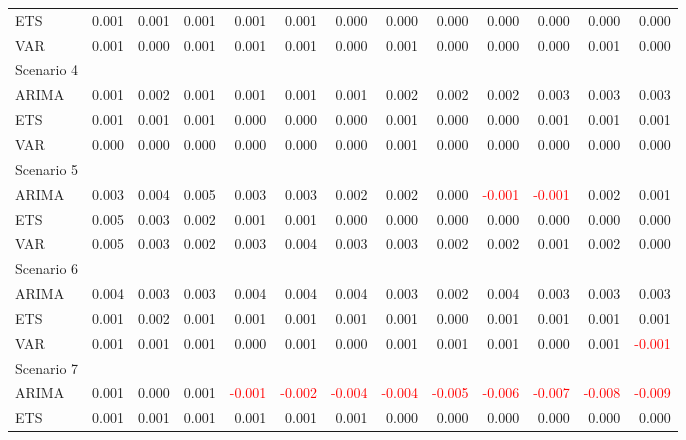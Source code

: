 \documentclass[a4paper,preprint,11pt,authoryear]{elsarticle}
\begin{document}
\begin{table}
{\begin{tabular}{lrrrrrrrrrrrr}
      ETS & 0.001 & 0.001 & 0.001 & 0.001 & 0.001 & 0.000 & 0.000 & 0.000 & 0.000 & 0.000 & 0.000 & 0.000 \\
      VAR & 0.001 & 0.000 & 0.001 & 0.001 & 0.001 & 0.000 & 0.001 & 0.000 & 0.000 & 0.000 & 0.001 & 0.000 \\
      \hline
      Scenario 4 & & & & & & & & & & & & \\
      \hline
      ARIMA & 0.001 & 0.002 & 0.001 & 0.001 & 0.001 & 0.001 & 0.002 & 0.002 & 0.002 & 0.003 & 0.003 & 0.003 \\
      ETS & 0.001 & 0.001 & 0.001 & 0.000 & 0.000 & 0.000 & 0.001 & 0.000 & 0.000 & 0.001 & 0.001 & 0.001 \\
      VAR & 0.000 & 0.000 & 0.000 & 0.000 & 0.000 & 0.000 & 0.001 & 0.000 & 0.000 & 0.000 & 0.000 & 0.000 \\
      \hline
      Scenario 5 & & & & & & & & & & & & \\
      \hline
      ARIMA & 0.003 & 0.004 & 0.005 & 0.003 & 0.003 & 0.002 & 0.002 & 0.000 & \textcolor{red}{-0.001} & \textcolor{red}{-0.001} & 0.002 & 0.001 \\
      ETS & 0.005 & 0.003 & 0.002 & 0.001 & 0.001 & 0.000 & 0.000 & 0.000 & 0.000 & 0.000 & 0.000 & 0.000 \\
      VAR & 0.005 & 0.003 & 0.002 & 0.003 & 0.004 & 0.003 & 0.003 & 0.002 & 0.002 & 0.001 & 0.002 & 0.000 \\
      \hline
      Scenario 6 & & & & & & & & & & & & \\
      \hline
      ARIMA & 0.004 & 0.003 & 0.003 & 0.004 & 0.004 & 0.004 & 0.003 & 0.002 & 0.004 & 0.003 & 0.003 & 0.003 \\
      ETS & 0.001 & 0.002 & 0.001 & 0.001 & 0.001 & 0.001 & 0.001 & 0.000 & 0.001 & 0.001 & 0.001 & 0.001 \\
      VAR & 0.001 & 0.001 & 0.001 & 0.000 & 0.001 & 0.000 & 0.001 & 0.001 & 0.001 & 0.000 & 0.001 & \textcolor{red}{-0.001} \\
      \hline
      Scenario 7 & & & & & & & & & & & & \\
      \hline
      ARIMA & 0.001 & 0.000 & 0.001 & \textcolor{red}{-0.001} & \textcolor{red}{-0.002} & \textcolor{red}{-0.004} & \textcolor{red}{-0.004} & \textcolor{red}{-0.005} & \textcolor{red}{-0.006} & \textcolor{red}{-0.007} & \textcolor{red}{-0.008} & \textcolor{red}{-0.009} \\
      ETS & 0.001 & 0.001 & 0.001 & 0.001 & 0.001 & 0.001 & 0.000 & 0.000 & 0.000 & 0.000 & 0.000 & 0.000 \\

\end{tabular}}
\end{table}
\end{document}
